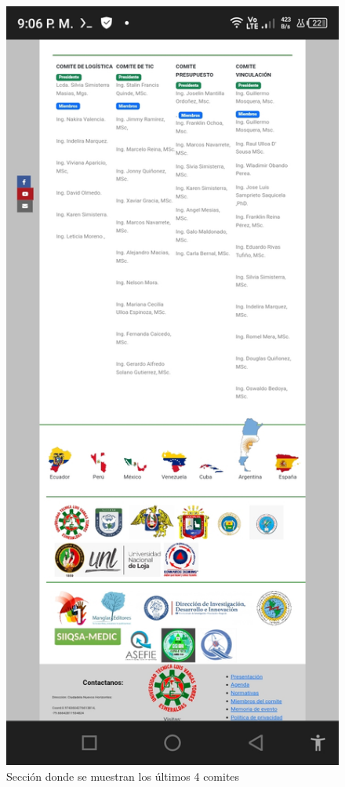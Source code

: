 \documentclass[a4paper,14px]{article}
\begin{document}
\begin{minipage}[H]{0.45\linewidth}
  \begin{figure}[H]
    \centering
    \includegraphics[scale=0.3]{comite2.jpg}
    \caption{Sección donde se muestran los últimos 4 comites}
    \label{fig:comite2}
  \end{figure}
\end{minipage}
\end{document}
